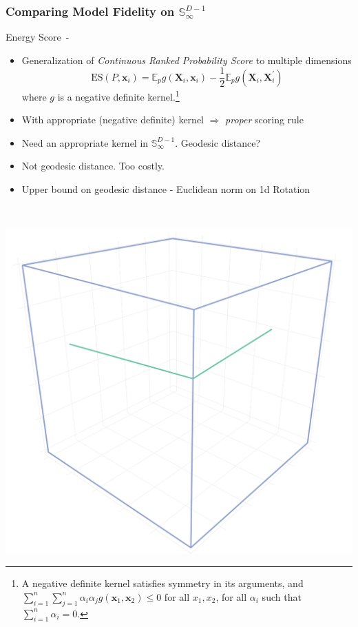 \documentclass[aspectratio=169,10pt]{beamer}
\begin{document}
\begin{frame}
    \frametitle{Comparing Model Fidelity on $\mathbb{S}_{\infty}^{D-1}$}
    Energy Score~-~\cite{gneiting2007}
    \label{pgpareto:energyscore}
    \begin{minipage}{0.7\textwidth}
    {\footnotesize 
    \begin{itemize}
    \item Generalization of \emph{Continuous Ranked Probability Score} 
        to multiple dimensions
        \[
        \text{ES}\left(P,\bm{x}_i\right) =  
            \mathbb{E}_p g\left(\bm{X}_i, \bm{x}_i\right)
            - \frac{1}{2}\mathbb{E}_p g\left(\bm{X}_i,\bm{X}_i^{\prime}\right)
        \]
        where $g$ is a negative definite kernel.\footnote{A negative 
        definite kernel satisfies symmetry in its arguments, and 
        $\sum_{i = 1}^n\sum_{j = 1}^n \alpha_i\alpha_j g(\bm{x}_1,\bm{x}_2) \leq 0$ 
        for all $x_1,x_2$, for all $\alpha_i$ such that $\sum_{i = 1}^n\alpha_i = 0$.
        }
    \item With appropriate (negative definite) kernel 
        $\Longrightarrow$ \emph{proper} scoring rule
    \item Need an appropriate kernel in $\mathbb{S}_{\infty}^{D-1}$.  Geodesic distance?
    \item Not geodesic distance.  Too costly.
    \item Upper bound on geodesic distance - Euclidean norm on 1d Rotation
    \end{itemize}
    \vfill
    }
    \end{minipage}%
    ~\hfill
    \begin{minipage}{0.29\textwidth}
    \begin{center}
        \includegraphics[width=\textwidth]{ch1/images/1drot}
    \end{center}
    \hyperlink{pgpareto:notgeodesic}{}
    \hyperlink{pgpareto:kerneldetails}{}
    

\end{minipage}
\end{frame}
\end{document}
